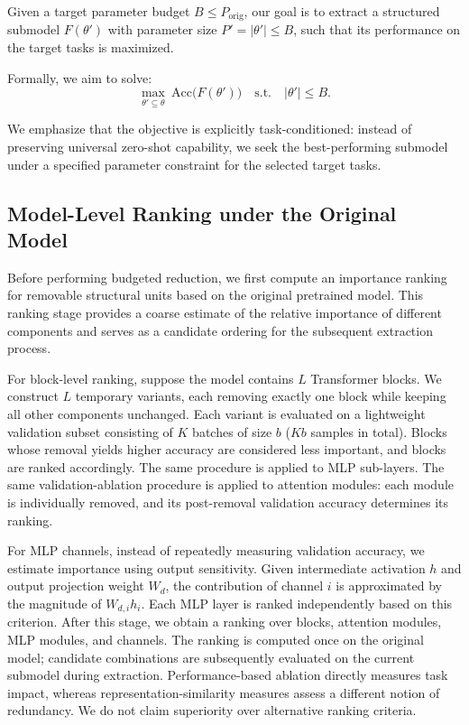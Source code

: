 \documentclass[11pt]{article}
\begin{document}
Given a target parameter budget $B \le P_{\mathrm{orig}}$, our goal is to extract a structured submodel $F(\theta')$ with parameter size $P' = |\theta'| \le B$, such that its performance on the target tasks is maximized.

Formally, we aim to solve:
\begin{equation}
\max_{\theta' \subseteq \theta} \ \mathrm{Acc}\big(F(\theta')\big)
\quad
\text{s.t.}
\quad
|\theta'| \le B.
\end{equation}

We emphasize that the objective is explicitly task-conditioned: instead of preserving universal zero-shot capability, we seek the best-performing submodel under a specified parameter constraint for the selected target tasks.

\subsection{Model-Level Ranking under the Original Model}

Before performing budgeted reduction, we first compute an importance ranking for removable structural units based on the original pretrained model. This ranking stage provides a coarse estimate of the relative importance of different components and serves as a candidate ordering for the subsequent extraction process.

For block-level ranking, suppose the model contains $L$ Transformer blocks. We construct $L$ temporary variants, each removing exactly one block while keeping all other components unchanged. Each variant is evaluated on a lightweight validation subset consisting of $K$ batches of size $b$ ($Kb$ samples in total). Blocks whose removal yields higher accuracy are considered less important, and blocks are ranked accordingly. The same procedure is applied to MLP sub-layers. The same validation-ablation procedure is applied to attention modules: each module is individually removed, and its post-removal validation accuracy determines its ranking.

For MLP channels, instead of repeatedly measuring validation accuracy, we estimate importance using output sensitivity. Given intermediate activation $h$ and output projection weight $W_d$, the contribution of channel $i$ is approximated by the magnitude of $W_{d,i} h_i$. Each MLP layer is ranked independently based on this criterion.
After this stage, we obtain a ranking over blocks, attention modules, MLP modules, and channels. The ranking is computed once on the original model; candidate combinations are subsequently evaluated on the current submodel during extraction. Performance-based ablation directly measures task impact, whereas representation-similarity measures assess a different notion of redundancy. We do not claim superiority over alternative ranking criteria.
\end{document}
